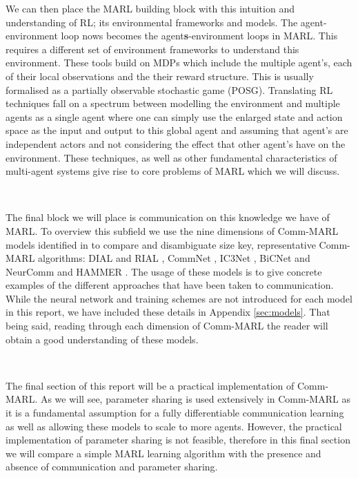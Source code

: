 \documentclass{article}
\begin{document}
We can then place the MARL building block with this intuition and understanding of RL; its environmental frameworks and models. The agent-environment loop nows becomes the agent\textbf{s}-environment loops in MARL. This requires a different set of environment frameworks to understand this environment. These tools build on MDPs which include the multiple agent's, each of their local observations and the their reward structure. This is usually formalised as a partially observable stochastic game (POSG). Translating RL techniques fall on a spectrum between modelling the environment and multiple agents as a single agent where one can simply use the enlarged state and action space as the input and output to this global agent and assuming that agent's are independent actors and not considering the effect that other agent's have on the environment. These techniques, as well as other fundamental characteristics of multi-agent systems give rise to core problems of MARL which we will discuss.


\

The final block we will place is communication on this knowledge we have of MARL. To overview this subfield we use the nine dimensions of Comm-MARL models identified in \citet{zhu2024survey} to compare and disambiguate size key, representative Comm-MARL algorithms: DIAL and RIAL \citep{foerster2016learning}, CommNet \citep{sukhbaatar2016commnet}, IC3Net \citep{singh2018ic3net}, BiCNet \citep{peng2017bicnet} and NeurComm \citep{chu2020NeurComm} and HAMMER \citep{gupta2022HAMMER}. The usage of these models is to give concrete examples of the different approaches that have been taken to communication. While the neural network and training schemes are not introduced for each model in this report, we have included these details in Appendix \ref{sec:models}. That being said, reading through each dimension of Comm-MARL the reader will obtain a good understanding of these models.

\

The final section of this report will be a practical implementation of Comm-MARL. As we will see, parameter sharing is used extensively in Comm-MARL as it is a fundamental assumption for a fully differentiable communication learning as well as allowing these models to scale to more agents. However, the practical implementation of parameter sharing is not feasible, therefore in this final section we will compare a simple MARL learning algorithm with the presence and absence of communication and parameter sharing.
\end{document}
